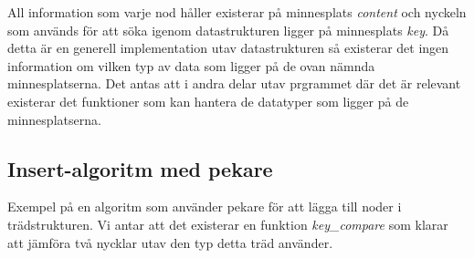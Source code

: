 \documentclass[a4paper]{article}
\begin{document}
			All information som varje nod håller existerar på minnesplats \emph{content} och nyckeln som används för att söka igenom datastrukturen ligger på minnesplats \emph{key}. Då detta är en generell implementation utav datastrukturen så existerar det ingen information om vilken typ av data som ligger på de ovan nämnda minnesplatserna. Det antas att i andra delar utav prgrammet där det är relevant existerar det funktioner som kan hantera de datatyper som ligger på de minnesplatserna.

			\pagebreak

		\subsection*{Insert-algoritm med pekare} %

			Exempel på en algoritm som använder pekare för att lägga till noder i trädstrukturen. Vi antar att det existerar en funktion \emph{key\_compare} som klarar att jämföra två nycklar utav den typ detta träd använder.
			
\end{document}
